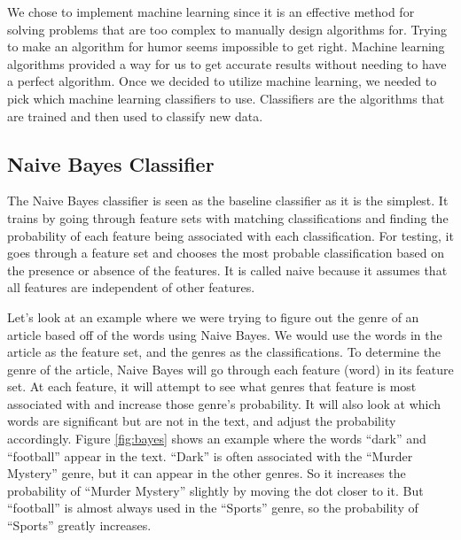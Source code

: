 We chose to implement machine learning since it is an effective method for solving problems that are too complex to manually design algorithms for. \cite{machine_learning} Trying to make an algorithm for humor seems impossible to get right. Machine learning algorithms provided a way for us to get accurate results without needing to have a perfect algorithm. Once we decided to utilize machine learning, we needed to pick which machine learning classifiers to use. Classifiers are the algorithms that are trained and then used to classify new data. 

\subsection{Naive Bayes Classifier}
The Naive Bayes classifier is seen as the baseline classifier as it is the simplest. It trains by going through feature sets with matching classifications and finding the probability of each feature being associated with each classification. For testing, it goes through a feature set and chooses the most probable classification based on the presence or absence of the features. It is called naive because it assumes that all features are independent of other features. \cite{NLTK}
 
Let's look at an example where we were trying to figure out the genre of an article based off of the words using Naive Bayes. We would use the words in the article as the feature set, and the genres as the classifications. To determine the genre of the article, Naive Bayes will go through each feature (word) in its feature set. At each feature, it will attempt to see what genres that feature is most associated with and increase those genre's probability. It will also look at which words are significant but are not in the text, and adjust the probability accordingly. Figure \ref{fig:bayes} shows an example where the words ``dark'' and ``football'' appear in the text. ``Dark'' is often associated with the ``Murder Mystery'' genre, but it can appear in the other genres.\cite{NLTK} So it increases the probability of ``Murder Mystery'' slightly by moving the dot closer to it. But ``football'' is almost always used in the ``Sports'' genre, so the probability of ``Sports'' greatly increases. 
 
